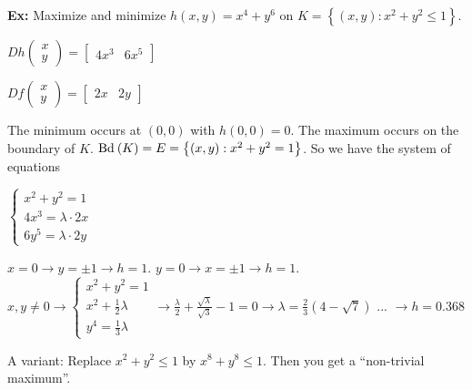 \documentclass[10pt,letterpaper]{article}
\newcommand{\n}{\hfill\break}
\newcommand{\ex}[1]{\par\noindent\settowidth{\hangindent}{\textbf{Ex: }}\textbf{Ex: }#1\n}
\newcommand{\ptxt}[1]{\textrm{\textnormal{#1}}}
\newcommand{\inlineeq}[1]{\centerline{$\displaystyle #1$}}
\newcommand{\set}[1]{\left\{#1\right\}}
\newcommand{\Bd}{\ptxt{Bd}\>}
\begin{document}
\ex{Maximize and minimize $h(x,y)=x^{4}+y^{6}$ on $K=\set{(x,y):x^{2}+y^{2}\le{}1}$.\n
\inlineeq{Dh\left(\begin{array}{c}x\\ y\end{array}\right)=\left[\begin{array}{cc}4x^{3} & 6x^{5}\end{array}\right]}\n
\inlineeq{Df\left(\begin{array}{c}x\\ y\end{array}\right)=\left[\begin{array}{cc}2x & 2y\end{array}\right]}\n
The minimum occurs at $(0,0)$ with $h(0,0)=0$. The maximum occurs on the boundary of $K$.\n
$\Bd(K)=E=\set{(x,y):x^{2}+y^{2}=1}$. So we have the system of equations\n
\inlineeq{\left\{\begin{array}{l}x^{2}+y^{2}=1\\ 4x^{3}=\lambda\cdot{}2x\\ 6y^{5}=\lambda\cdot{}2y\end{array}\right.}\n
$x=0\to{}y=\pm{}1\to{}h=1$.\n
$y=0\to{}x=\pm{}1\to{}h=1$.\n
\n
$x,y\ne{}0\to\left\{\begin{array}{l}x^{2}+y^{2}=1\\ x^{2}+\frac{1}{2}\lambda\\ y^{4}=\frac{1}{3}\lambda\end{array}\right.\to\frac{\lambda}{2}+\frac{\sqrt{\lambda}}{\sqrt{3}}-1=0\to\lambda=\frac{2}{3}(4-\sqrt{7})$ ... $\to{}h=0.368$}

\par\noindent A variant: Replace $x^{2}+y^{2}\le{}1$ by $x^{8}+y^{8}\le{}1$. Then you get a ``non-trivial maximum''.
\end{document}
